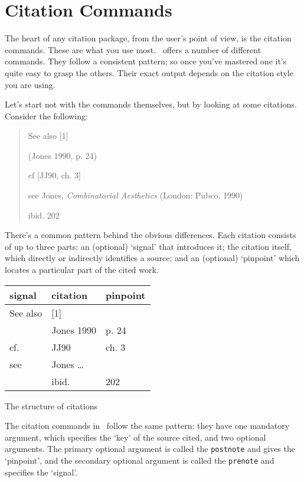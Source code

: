 \chapter{Citation Commands}\label{ch:citationcommands}

The heart of any citation package, from the user’s point of view, is
the citation commands. These are what you use most. \biblatex\ offers a
number of different commands. They follow a consistent pattern; so
once you’ve mastered one it’s quite easy to grasp the others. Their
exact output depends on the citation style you are using.

Let's start not with the commands themselves, but by looking at some
citations. Consider the following:

\begin{quote}
See also [1]

(Jones 1990, p. 24)

cf [JJ90, ch. 3]

see Jones, \emph{Combinatorial Aesthetics} (London: Pubco, 1990)

ibid. 202
\end{quote}

There's a common pattern behind the obvious differences. Each citation
consists of up to three parts: an (optional) `signal' that introduces
it; the citation itself, which directly or indirectly identifies a
source; and an (optional) `pinpoint' which locates a particular part
of the cited work.

\begin{margintable}
\begin{tabular}{lll}
\toprule
\textsf{signal} & \textsf{citation} & \textsf{pinpoint} \\
\midrule 
See also &   [1] \\
         &   Jones 1990   & p. 24 \\
cf.      &   JJ90         & ch. 3 \\
see      &   Jones \ldots\    \\ 
         &   ibid.        &  202 \\
\bottomrule
\end{tabular}
\vspace{3pt}
\caption{The structure of citations}
\end{margintable}

The citation commands in \biblatex\ follow the same pattern: they have
one mandatory argument, which specifies the `key' of the source cited,
and two optional arguments. The primary optional argument is called
the \texttt{postnote} and gives the `pinpoint', and the secondary optional
argument is called the \texttt{prenote} and specifies the `signal'.

